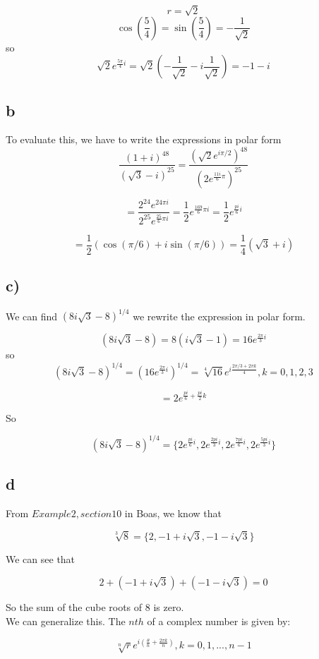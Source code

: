 \documentclass[a4paper,norsk, 10pt]{article}
\begin{document}
$$
r = \sqrt{2}
$$
$$
\cos(\frac{5}{4}) = \sin(\frac{5}{4}) = -\frac{1}{\sqrt{2}}
$$
so
$$
\sqrt{2} e^{\frac{5\pi}{4}i} = \sqrt{2}(-\frac{1}{\sqrt{2}} - i\frac{1}{\sqrt{2}}) = -1-i
$$

\subsection*{b}
To evaluate this, we have to write the expressions in polar form
$$
\frac{(1+i)^{48}}{(\sqrt{3} - i)^{25}} = \frac{(\sqrt{2}e^{i \pi/2})^{48}}{(2e^{\frac{11i}{6}\pi})^{25}}
$$

$$
= \frac{2^{24}e^{24\pi i}}{2^{25}e^{\frac{25}{6}\pi i}} = \frac{1}{2}e^{\frac{169}{6}\pi i} = \frac{1}{2}e^{\frac{pi}{6}i}
$$

$$
= \frac{1}{2}(\cos(\pi / 6) + i\sin(\pi /6)) = \frac{1}{4}(\sqrt{3} + i)
$$

\subsection*{c)}
We can find $(8i\sqrt{3} - 8)^{1/4}$ we rewrite the expression in polar form.

$$
(8i\sqrt{3} - 8) = 8(i\sqrt{3} - 1) = 16e^{\frac{2\pi}{3}i}
$$
so
$$
(8i\sqrt{3} - 8)^{1/4} = (16e^{\frac{2\pi}{3}i})^{1/4} = \sqrt[4]{16}e^{i\frac{2\pi / 3 + 2\pi k}{4}} ,k = 0,1,2,3
$$

$$
= 2e^{\frac{pi}{6} + \frac{pi}{2}k}
$$

So

$$
(8i\sqrt{3} - 8)^{1/4} = \{2e^{\frac{pi}{6}i},2e^{\frac{2pi}{3}i},2e^{\frac{7pi}{6}i},2e^{\frac{5pi}{3}i} \}
$$

\subsection*{d}

From $Example 2, section 10$ in Boas, we know that

$$
\sqrt[3]{8} = \{2, -1+i\sqrt{3},-1-i\sqrt{3} \}
$$

We can see that 

$$
2 + (-1+i\sqrt{3}) + (-1-i\sqrt{3}) = 0
$$

So the sum of the cube roots of 8 is zero.\\

We can generalize this. The $nth$ of a complex number is given by:

$$
\sqrt[n]{r}e^{i(\frac{\theta}{n} + \frac{2\pi k}{n})},k = 0,1,...,n-1
$$
\end{document}
